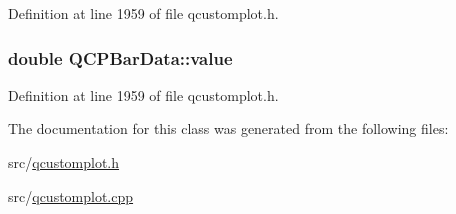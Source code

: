 Definition at line 1959 of file qcustomplot.\-h.

\hypertarget{class_q_c_p_bar_data_acab57005d8916d61b64e9ddef6113b60}{
\subsubsection[{value}]{\setlength{\rightskip}{0pt plus 5cm}double Q\-C\-P\-Bar\-Data\-::value}}\label{class_q_c_p_bar_data_acab57005d8916d61b64e9ddef6113b60}


Definition at line 1959 of file qcustomplot.\-h.



The documentation for this class was generated from the following files\-:\begin{DoxyCompactItemize}
\item 
src/\hyperlink{qcustomplot_8h}{qcustomplot.\-h}\item 
src/\hyperlink{qcustomplot_8cpp}{qcustomplot.\-cpp}\end{DoxyCompactItemize}
